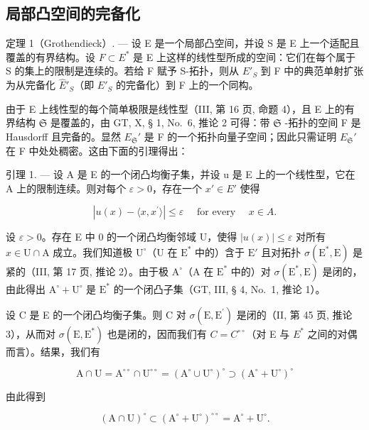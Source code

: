 \subsection{局部凸空间的完备化}

定理 1（Grothendieck）. --- 设 E 是一个局部凸空间，并设 S 是 E 上一个适配且覆盖的有界结构。设 \(F \subset E^{*}\) 是 E 上这样的线性型所成的空间：它们在每个属于 S 的集上的限制是连续的。若给 F 赋予 S-拓扑，则从 \(E'_{S}\) 到 F 中的典范单射扩张为从完备化 \(\hat{E}'_{S}\)（即 \(E'_{S}\) 的完备化）到 F 上的一个同构。

由于 E 上线性型的每个简单极限是线性型（III, 第 16 页, 命题 4），且 E 上的有界结构 \(\mathfrak{S}\) 是覆盖的，由 GT, X, § 1, No.~6, 推论 2 可得：带 \(\mathfrak{S}\) -拓扑的空间 F 是 Hausdorff 且完备的。显然 \(E_{\mathfrak{S}}'\) 是 F 的一个拓扑向量子空间；因此只需证明 \(E_{\mathfrak{S}}'\) 在 F 中处处稠密。这由下面的引理得出：

引理 1. --- 设 A 是 E 的一个闭凸均衡子集，并设 u 是 E 上的一个线性型，它在 A 上的限制连续。则对每个 \(\varepsilon > 0\)，存在一个 \(x' \in E'\) 使得

\[
\left| u (x) - \langle x, x ^ {\prime} \rangle \right| \leqslant \varepsilon \quad \text { for   every } \quad x \in A.
\]

设 \(\varepsilon > 0\)。存在 E 中 0 的一个闭凸均衡邻域 U，使得 \(|u(x)| \leqslant \varepsilon\) 对所有 \(x \in \mathrm{U} \cap \mathrm{A}\) 成立。我们知道极 \(\mathrm{U}^{\circ}\)（U 在 \(\mathrm{E}^{*}\) 中的）含于 \(\mathrm{E}'\) 且对拓扑 \(\sigma(\mathrm{E}^{*}, \mathrm{E})\) 是紧的（III, 第 17 页, 推论 2）。由于极 \(\mathrm{A}^{\circ}\)（A 在 \(\mathrm{E}^{*}\) 中的）对 \(\sigma(\mathrm{E}^{*}, \mathrm{E})\) 是闭的，由此得出 \(\mathrm{A}^{\circ} + \mathrm{U}^{\circ}\) 是 \(\mathrm{E}^{*}\) 的一个闭凸子集（GT, III, § 4, No.~1, 推论 1）。

设 C 是 E 的一个闭凸均衡子集。则 C 对 \(\sigma(\mathrm{E},\mathrm{E}^{\prime})\) 是闭的（II, 第 45 页, 推论 3），从而对 \(\sigma(\mathrm{E},\mathrm{E}^{*})\) 也是闭的，因而我们有 \(C = C^{\circ\circ}\)（对 E 与 \(E^{*}\) 之间的对偶而言）。结果，我们有

\[
\mathrm{A} \cap \mathrm{U} = \mathrm{A} ^ {\circ \circ} \cap \mathrm{U} ^ {\circ \circ} = (\mathrm{A} ^ {\circ} \cup \mathrm{U} ^ {\circ}) ^ {\circ} \supset (\mathrm{A} ^ {\circ} + \mathrm{U} ^ {\circ}) ^ {\circ}
\]

由此得到

\[
(\mathrm{A} \cap \mathrm{U}) ^ {\circ} \subset (\mathrm{A} ^ {\circ} + \mathrm{U} ^ {\circ}) ^ {\circ \circ} = \mathrm{A} ^ {\circ} + \mathrm{U} ^ {\circ}.
\]

